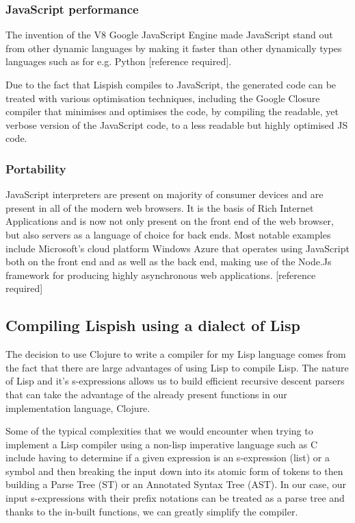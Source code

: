 \subsubsection{JavaScript performance}
The invention of the V8 Google JavaScript Engine made JavaScript stand out from other dynamic languages by making it faster than other dynamically types languages such as for e.g. Python [reference required].

Due to the fact that Lispish compiles to JavaScript, the generated code can be treated with various optimisation techniques, including the Google Closure compiler that minimises and optimises the code, by compiling the readable, yet verbose version of the JavaScript code, to a less readable but highly optimised JS code.

\subsubsection{Portability}
JavaScript interpreters are present on majority of consumer devices and are present in all of the modern web browsers. It is the basis of Rich Internet Applications and is now not only present on the front end of the web browser, but also servers as a language of choice for back ends.
Most notable examples include Microsoft's cloud platform Windows Azure that operates using JavaScript both on the front end and as well as the back end, making use of the Node.Js framework for producing highly asynchronous web applications. [reference required]

\subsection{Compiling Lispish using a dialect of Lisp}
The decision to use Clojure to write a compiler for my Lisp language comes from the fact that there are large advantages of using Lisp to compile Lisp.
The nature of Lisp and it's s-expressions allows us to build efficient recursive descent parsers that can take the advantage of the already present functions in our implementation language, Clojure.

Some of the typical complexities that we would encounter when trying to implement a Lisp compiler using a non-lisp imperative language such as C include having to determine if a given expression is an s-expression (list) or a symbol and then breaking the input down into its atomic form of tokens to then building a Parse Tree (ST) or an Annotated Syntax Tree (AST).
In our case, our input s-expressions with their prefix notations can be treated as a parse tree and thanks to the in-built functions, we can greatly simplify the compiler.

